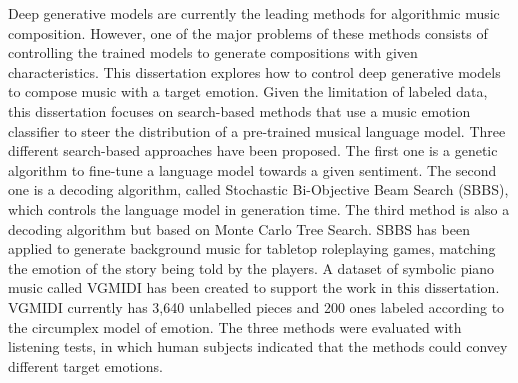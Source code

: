 Deep generative models are currently the leading methods for algorithmic music composition. However, one of the major problems of these methods consists of controlling the trained models to generate compositions with given characteristics. This dissertation explores how to control deep generative models to compose music with a target emotion. Given the limitation of labeled data, this dissertation focuses on search-based methods that use a music emotion classifier to steer the distribution of a pre-trained musical language model. Three different search-based approaches have been proposed. The first one is a genetic algorithm to fine-tune a language model towards a given sentiment. The second one is a decoding algorithm, called Stochastic Bi-Objective Beam Search (SBBS), which controls the language model in generation time. The third method is also a decoding algorithm but based on Monte Carlo Tree Search. SBBS has been applied to generate background music for tabletop roleplaying games, matching the emotion of the story being told by the players. A dataset of symbolic piano music called VGMIDI has been created to support the work in this dissertation. VGMIDI currently has 3,640 unlabelled pieces and 200 ones labeled according to the circumplex model of emotion. The three methods were evaluated with listening tests, in which human subjects indicated that the methods could convey different target emotions.

